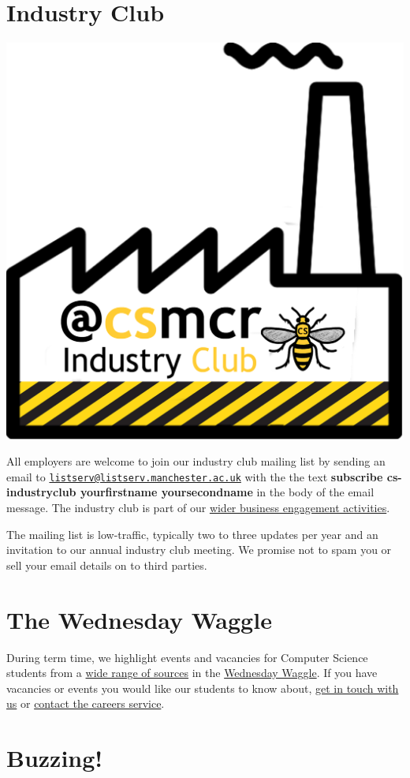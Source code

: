 \documentclass[12pt,]{book}
\begin{document}
\hypertarget{industry-club}{%
\section{Industry Club}\label{industry-club}}

\begin{center}\includegraphics[width=0.4\linewidth]{images/industry-club-black} \end{center}

All employers are welcome to join our industry club mailing list by sending an email to \href{mailto:listserv@listserv.manchester.ac.uk}{\nolinkurl{listserv@listserv.manchester.ac.uk}} with the the text \textbf{subscribe cs-industryclub yourfirstname yoursecondname} in the body of the email message. The industry club is part of our \href{https://www.cs.manchester.ac.uk/connect/business-engagement/}{wider business engagement activities}.

The mailing list is low-traffic, typically two to three updates per year and an invitation to our annual industry club meeting. We promise not to spam you or sell your email details on to third parties.

\hypertarget{the-wednesday-waggle}{%
\section{The Wednesday Waggle}\label{the-wednesday-waggle}}

During term time, we highlight events and vacancies for Computer Science students from a \href{http://dullhunk.github.io/where-can-I-look-for-jobs.html}{wide range of sources} in the \href{https://waggle.cs.manchester.ac.uk/waggle/about}{Wednesday Waggle}. If you have vacancies or events you would like our students to know about, \protect\hyperlink{contact}{get in touch with us} or \href{http://www.careers.manchester.ac.uk/aboutus/contact/}{contact the careers service}.

\hypertarget{buzzing}{%
\section{Buzzing! 🐝}\label{buzzing}}
\end{document}
